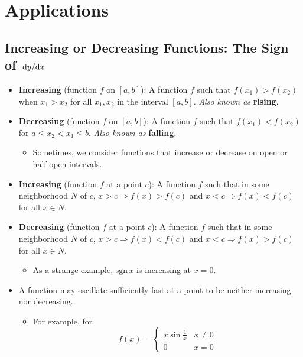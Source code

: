 \documentclass[../main.tex]{subfiles}
\begin{document}
\chapter{Applications}
\section{Increasing or Decreasing Functions: The Sign of \texorpdfstring{$\dv*{y}{x}$}{TEXT}}
\begin{itemize}
    \item {}\textbf{Increasing} (function $f$ on $[a,b]$): A function $f$ such that $f(x_1)>f(x_2)$ when $x_1>x_2$ for all $x_1,x_2$ in the interval $[a,b]$. \emph{Also known as} \textbf{rising}.
    \item \textbf{Decreasing} (function $f$ on $[a,b]$): A function $f$ such that $f(x_1)<f(x_2)$ for $a\leq x_2<x_1\leq b$. \emph{Also known as} \textbf{falling}.
    \begin{itemize}
        \item Sometimes, we consider functions that increase or decrease on open or half-open intervals.
    \end{itemize}
    \item \textbf{Increasing} (function $f$ at a point $c$): A function $f$ such that in some neighborhood $N$ of $c$, $x>c \Rightarrow f(x)>f(c)$ and $x<c \Rightarrow f(x)<f(c)$ for all $x\in N$.
    \item \textbf{Decreasing} (function $f$ at a point $c$): A function $f$ such that in some neighborhood $N$ of $c$, $x>c \Rightarrow f(x)<f(c)$ and $x<c \Rightarrow f(x)>f(c)$ for all $x\in N$.
    \begin{itemize}
        \item As a strange example, $\text{sgn}\, x$ is increasing at $x=0$.
    \end{itemize}
    \item A function may oscillate sufficiently fast at a point to be neither increasing nor decreasing.
    \begin{itemize}
        \item For example, for
        \begin{equation*}
            f(x) =
            \begin{cases}
                x\sin\frac{1}{x} & x\neq 0\\
                0 & x=0
            \end{cases}
        \end{equation*}

\end{itemize}
\end{itemize}
\end{document}
